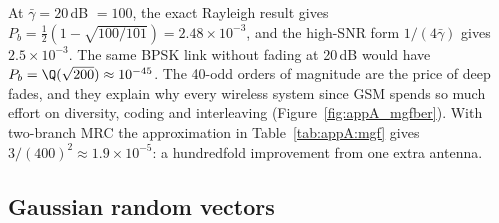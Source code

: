 
\begin{worked}
At $\bar\gamma=20$\,dB $=100$, the exact Rayleigh result gives
$P_b=\tfrac12(1-\sqrt{100/101})=2.48\times10^{-3}$, and the high-SNR form $1/(4\bar\gamma)$ gives
$2.5\times10^{-3}$. The same BPSK link without fading at 20\,dB would have
$P_b=\Q(\sqrt{200})\approx10^{-45}$. The 40-odd orders of magnitude are the price of deep fades,
and they explain why every wireless system since GSM spends so much effort on diversity, coding
and interleaving (Figure~\ref{fig:appA_mgfber}). With two-branch MRC the approximation in
Table~\ref{tab:appA:mgf} gives $3/(400)^2\approx1.9\times10^{-5}$: a hundredfold improvement from
one extra antenna.
\end{worked}

\subsection{Gaussian random vectors}

